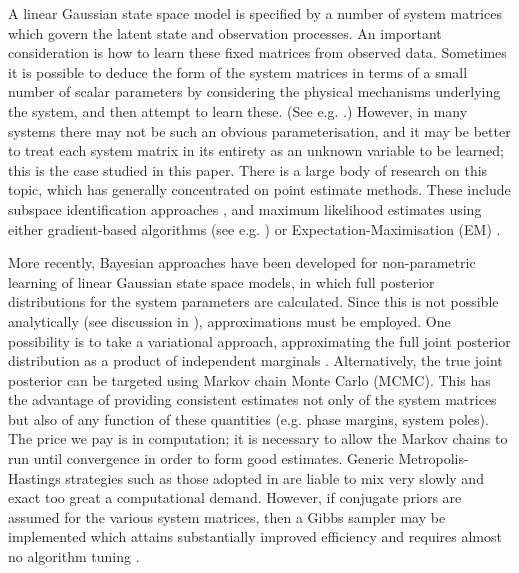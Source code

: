 \documentclass[journal,10pt]{IEEEtran}
\begin{document}
A linear Gaussian state space model is specified by a number of system matrices which govern the latent state and observation processes. An important consideration is how to learn these fixed matrices from observed data. Sometimes it is possible to deduce the form of the system matrices in terms of a small number of scalar parameters by considering the physical mechanisms underlying the system, and then attempt to learn these. (See e.g. \cite{Kantas2009,Andrieu2010}.) However, in many systems there may not be such an obvious parameterisation, and it may be better to treat each system matrix in its entirety as an unknown variable to be learned; this is the case studied in this paper. There is a large body of research on this topic, which has generally concentrated on point estimate methods. These include subspace identification approaches \cite{VanOverschee1991,Viberg1995}, and maximum likelihood estimates using either gradient-based algorithms (see e.g. \cite{Cappe2005,Sarkka2013}) or Expectation-Maximisation (EM) \cite{Shumway1982,Digalakis1993,Ghahramani1996,Gibson2005,Li2009}.

More recently, Bayesian approaches have been developed for non-parametric learning of linear Gaussian state space models, in which full posterior distributions for the system parameters are calculated. Since this is not possible analytically (see discussion in \cite{Beal2003}), approximations must be employed. One possibility is to take a variational approach, approximating the full joint posterior distribution as a product of independent marginals \cite{Ghahramani2001,Beal2003,Barber2007}. Alternatively, the true joint posterior can be targeted using Markov chain Monte Carlo (MCMC). This has the advantage of providing consistent estimates not only of the system matrices but also of any function of these quantities (e.g. phase margins, system poles). The price we pay is in computation; it is necessary to allow the Markov chains to run until convergence in order to form good estimates. Generic Metropolis-Hastings strategies such as those adopted in \cite{Ninness2010} are liable to mix very slowly and exact too great a computational demand. However, if conjugate priors are assumed for the various system matrices, then a Gibbs sampler may be implemented which attains substantially improved efficiency and requires almost no algorithm tuning \cite{Wills2012}.
\end{document}
